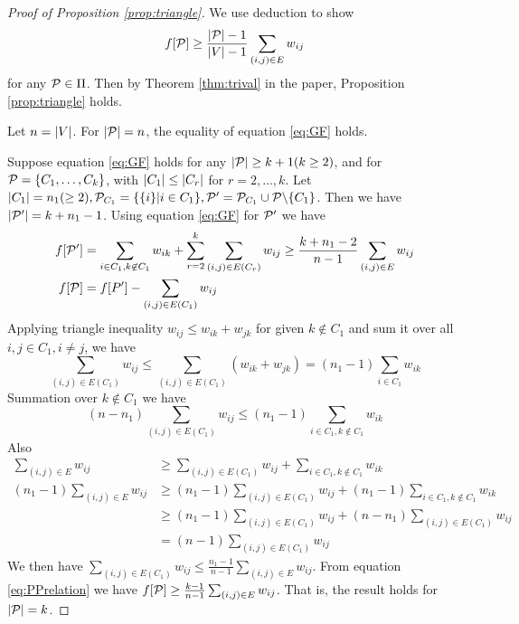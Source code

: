 \begin{proof}[Proof of Proposition \ref{prop:triangle}]

We use deduction to show  
\begin{equation}\label{eq:GF}
f[\P] \geq \frac{\abs{\P}-1}{\abs{V}-1} \sum_{(i,j) \in E} w_{ij}
\end{equation}
for any $\P \in \Pi$. Then by Theorem \ref{thm:trival} in the paper, Proposition \ref{prop:triangle} holds. 

Let $n=\abs{V}$. For $\abs{\P}=n$, the equality of equation \ref{eq:GF} holds. 

Suppose equation \eqref{eq:GF} holds for any $\abs{\P} \geq k+1(k\geq 2)$, and for $\P=\{C_1, \dots, C_k\}$, with $\abs{C_1} \leq \abs{C_r}$ for $r=2,\dots, k$. Let $\abs{C_1}=n_1(\geq 2), \P_{C_1} = \{\{i\}| i \in C_1\}, \P'=\P_{C_1} \cup \P \backslash \{C_1\}$. Then we have $\abs{\P'} = k+n_1-1$. Using equation \eqref{eq:GF} for $\P'$ we have
\begin{align}\label{eq:PPrelation}
f[\P'] & = \sum_{i\in C_1, k \not\in C_1} w_{ik} + \sum_{r=2}^k \sum_{(i,j) \in E(C_r)} w_{ij}\geq \frac{k+n_1 -2}{n-1}\sum_{(i,j) \in E} w_{ij} \\
f[\P] & =f[P'] - \sum_{(i,j) \in E(C_1)} w_{ij}
\end{align}
Applying triangle inequality $w_{ij} \leq w_{ik} + w_{jk}$ for given $k\not\in C_1$ and sum it over all $i, j \in C_1, i\neq j$, we have
$$
\sum_{(i,j) \in E(C_1)} w_{ij} \leq \sum_{(i,j) \in E(C_1)} (w_{ik} + w_{jk}) = (n_1-1)\sum_{i\in C_1} w_{ik}
$$
Summation over $k \not\in C_1$ we have 
$$
(n - n_1) \sum_{(i,j) \in E(C_1)} w_{ij} \leq (n_1 - 1) \sum_{i \in C_1, k \not\in C_1} w_{ik}
$$
Also
\begin{align*}
\sum_{(i,j) \in E} w_{ij}  & \geq \sum_{(i,j) \in E(C_1)} w_{ij} + \sum_{i\in C_1, k\not\in C_1} w_{ik} \\
(n_1 - 1)\sum_{(i,j) \in E} w_{ij}  & \geq (n_1 -1 )\sum_{(i,j) \in E(C_1)} w_{ij} + (n_1-1)\sum_{i\in C_1, k\not\in C_1} w_{ik} \\
& \geq (n_1 -1 )\sum_{(i,j) \in E(C_1)} w_{ij} + (n - n_1) \sum_{(i,j) \in E(C_1)} w_{ij}\\
& = (n-1) \sum_{(i,j) \in E(C_1)} w_{ij}
\end{align*}
We then have $\sum_{(i,j) \in E(C_1)} w_{ij} \leq \frac{n_1-1}{n-1}\sum_{(i,j) \in E} w_{ij}$. From equation \eqref{eq:PPrelation} we have 
$f[\P] \geq \frac{k-1}{n-1}\sum_{(i,j) \in E} w_{ij}$. That is, the result holds for $\abs{\P}=k$.
\end{proof}

